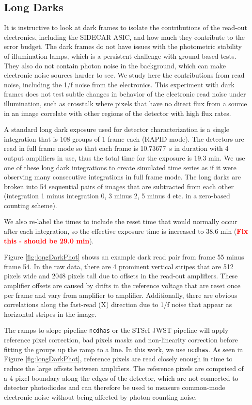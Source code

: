 \documentclass[]{aastex62}
\begin{document}
\subsection{Long Darks}\label{sec:longDarks}

It is instructive to look at dark frames to isolate the contributions of the read-out electronics, including the SIDECAR ASIC, and how much they contribute to the error budget.
The dark frames do not have issues with the photometric stability of illumination lamps, which is a persistent challenge with ground-based tests.
They also do not contain photon noise in the background, which can make electronic noise sources harder to see.
We study here the contributions from read noise, including the 1/f noise from the electronics.
This experiment with dark frames does not test subtle changes in behavior of the electronic read noise under illumination, such as crosstalk where pixels that have no direct flux from a source in an image correlate with other regions of the detector with high flux rates.

A standard long dark exposure used for detector characterization is a single integration that is 108 groups of 1 frame each (RAPID mode).
The detectors are read in full frame mode so that each frame is 10.73677~s in duration with 4 output amplifiers in use, thus the total time for the exposure is 19.3 min.
We use one of these long dark integrations to create simulated time series as if it were observing many consecutive integrations in full frame mode.
The long darks are broken into 54 sequential pairs of images that are subtracted from each other (integration 1 minus integration 0, 3 minus 2, 5 minus 4 etc. in a zero-based counting scheme).

We also re-label the times to include the reset time that would normally occur after each integration, so the effective exposure time is increased to 38.6 min (\textcolor{red}{\bf Fix this - should be 29.0 min}).

Figure \ref{fig:longDarkPhot} shows an example dark read pair from frame 55 minus frame 54.
In the raw data, there are 4 prominent vertical stripes that are 512 pixels wide and 2048 pixels tall due to offsets in the read-out amplifiers.
These amplifier offsets are caused by drifts in the reference voltage that are reset once per frame and vary from amplifier to amplifier.
Additionally, there are obvious correlations along the fast-read (X) direction due to 1/f noise that appear as horizontal stripes in the image.

The ramps-to-slope pipeline \texttt{ncdhas} or the STScI JWST pipeline will apply reference pixel correction, bad pixels masks and non-linearity correction before fitting the groups up the ramp to a line.
In this work, we use \texttt{ncdhas}.
As seen in Figure \ref{fig:longDarkPhot}, reference pixels are read closely enough in time to reduce the large offsets between amplifiers.
The reference pixels are comprised of a 4 pixel boundary along the edges of the detector, which are not connected to detector photodiodes and can therefore be used to measure common-mode electronic noise without being affected by photon counting noise.
\end{document}
